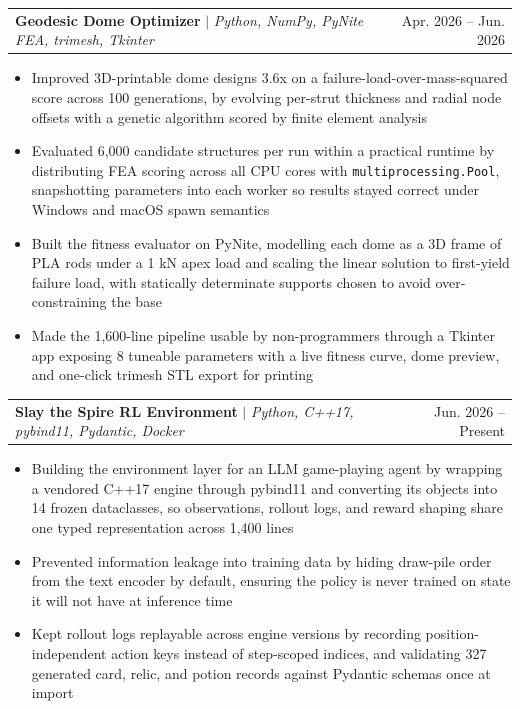 \documentclass[letterpaper,11pt]{article}
\makeatletter
\newcommand{\resumeItem}[1]{
  \item\small{
    {#1 \vspace{-2pt}}
  }
}
\newcommand{\resumeProjectHeading}[2]{
    \item
    \begin{tabular*}{0.97\textwidth}{l@{\extracolsep{\fill}}r}
      \small#1 & #2 \\
    \end{tabular*}\vspace{-7pt}
}
\newcommand{\resumeItemListStart}{\begin{itemize}}
\newcommand{\resumeItemListEnd}{\end{itemize}\vspace{-7pt}}
\makeatother
\begin{document}
      \resumeProjectHeading
          {\textbf{Geodesic Dome Optimizer} $|$ \emph{Python, NumPy, PyNite FEA, trimesh, Tkinter}}{Apr. 2026 -- Jun. 2026}
          \resumeItemListStart
            \resumeItem{Improved 3D-printable dome designs 3.6x on a failure-load-over-mass-squared score across 100 generations, by evolving per-strut thickness and radial node offsets with a genetic algorithm scored by finite element analysis}
            \resumeItem{Evaluated 6,000 candidate structures per run within a practical runtime by distributing FEA scoring across all CPU cores with \texttt{multiprocessing.Pool}, snapshotting parameters into each worker so results stayed correct under Windows and macOS spawn semantics}
            \resumeItem{Built the fitness evaluator on PyNite, modelling each dome as a 3D frame of PLA rods under a 1 kN apex load and scaling the linear solution to first-yield failure load, with statically determinate supports chosen to avoid over-constraining the base}
            \resumeItem{Made the 1,600-line pipeline usable by non-programmers through a Tkinter app exposing 8 tuneable parameters with a live fitness curve, dome preview, and one-click trimesh STL export for printing}
          \resumeItemListEnd

      \resumeProjectHeading
          {\textbf{Slay the Spire RL Environment} $|$ \emph{Python, C++17, pybind11, Pydantic, Docker}}{Jun. 2026 -- Present}
          \resumeItemListStart
            \resumeItem{Building the environment layer for an LLM game-playing agent by wrapping a vendored C++17 engine through pybind11 and converting its objects into 14 frozen dataclasses, so observations, rollout logs, and reward shaping share one typed representation across 1,400 lines}
            \resumeItem{Prevented information leakage into training data by hiding draw-pile order from the text encoder by default, ensuring the policy is never trained on state it will not have at inference time}
            \resumeItem{Kept rollout logs replayable across engine versions by recording position-independent action keys instead of step-scoped indices, and validating 327 generated card, relic, and potion records against Pydantic schemas once at import}
          \resumeItemListEnd
\end{document}
